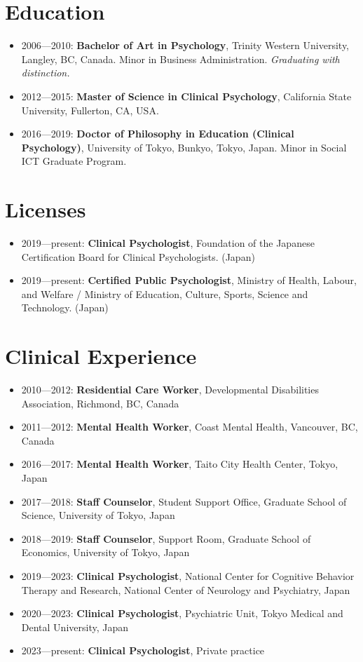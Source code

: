 \documentclass[a4paper]{article}
\begin{document}
\section{Education}
\begin{itemize}
	\item 2006---2010: \textbf{Bachelor of Art in Psychology}, Trinity Western University, Langley, BC, Canada. Minor in Business Administration. \textit{Graduating with distinction.}
	\item 2012---2015: \textbf{Master of Science in Clinical Psychology}, California State University, Fullerton, CA, USA. 
	\item 2016---2019: \textbf{Doctor of Philosophy in Education (Clinical Psychology)}, University of Tokyo, Bunkyo, Tokyo, Japan. Minor in Social ICT Graduate Program.
\end{itemize}

\section{Licenses}
\begin{itemize}
	\item 2019---present: \textbf{Clinical Psychologist}, Foundation of the Japanese Certification Board for Clinical Psychologists. (Japan)
	\item 2019---present: \textbf{Certified Public Psychologist}, Ministry of Health, Labour, and Welfare / Ministry of Education, Culture, Sports, Science and Technology. (Japan)
\end{itemize} 

\section{Clinical Experience}
\begin{itemize}
	\item 2010---2012: \textbf{Residential Care Worker}, Developmental Disabilities Association, Richmond, BC, Canada
	\item 2011---2012: \textbf{Mental Health Worker}, Coast Mental Health, Vancouver, BC, Canada
	\item 2016---2017: \textbf{Mental Health Worker}, Taito City Health Center, Tokyo, Japan
	\item 2017---2018: \textbf{Staff Counselor}, Student Support Office, Graduate School of Science, University of Tokyo, Japan
	\item 2018---2019: \textbf{Staff Counselor}, Support Room, Graduate School of Economics, University of Tokyo, Japan
	\item 2019---2023: \textbf{Clinical Psychologist}, National Center for Cognitive Behavior Therapy and Research, National Center of Neurology and Psychiatry, Japan
	\item 2020---2023: \textbf{Clinical Psychologist}, Psychiatric Unit, Tokyo Medical and Dental University, Japan
	\item 2023---present: \textbf{Clinical Psychologist}, Private practice
\end{itemize}
\end{document}
